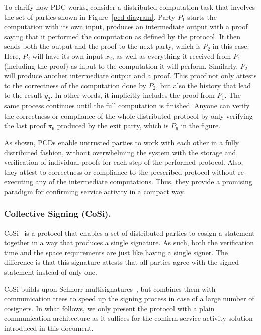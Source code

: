 To clarify how PDC works, consider a distributed computation task that involves 
the set of parties shown in Figure~\ref{pcd-diagram}. Party $P_1$ starts the computation with its 
own input, produces an intermediate output with a proof saying that it performed 
the computation as defined by the protocol. It then sends both the output and the proof 
to the next party, which is $P_2$ in this case. Here, $P_2$ will 
have its own input $x_2$, as well as everything it received from $P_1$ (including the proof) 
as input to the computation it will perform. Similarly, $P_2$ will produce another 
intermediate output and a proof. This proof not only attests to the correctness of the 
computation done by $P_2$, but also the history that lead to the result $y_2$. In other 
words, it implicitly includes 
the proof from $P_1$. The same process continues until the full computation is finished. 
Anyone can verify the correctness or compliance of the whole distributed protocol by 
only verifying the last proof $\pi_6$ produced by the exit party, which is $P_6$ in the figure.


As shown, PCDs enable untrusted parties to work with each other in a fully distributed 
fashion, without overwhelming the system with the storage and verification of individual 
proofs for each step of the performed protocol. Also, they attest to correctness or compliance  
to the prescribed protocol without re-executing any of the intermediate computations. Thus, 
they provide a promising paradigm for confirming service activity in a compact way.


\subsubsection{Collective Signing (CoSi).}
\label{cosi}
CoSi~\cite{syta2016keeping} is a protocol that enables a set of distributed parties to cosign a 
statement together in a way that produces a single signature. As such, both the 
verification time and the space requirements are just like having a single signer. The 
difference is that this signature attests that all parties agree with the signed 
statement instead of only one.


CoSi builds upon Schnorr 
multisignatures~\cite{schnorr1991efficient, bellare2006multi, micali2001accountable}, but combines 
them with communication trees to speed up the signing process in 
case of a large number of cosigners. In what follows, we only present the protocol
with a plain communication architecture as it suffices for the confirm service activity 
solution introduced in this document.


